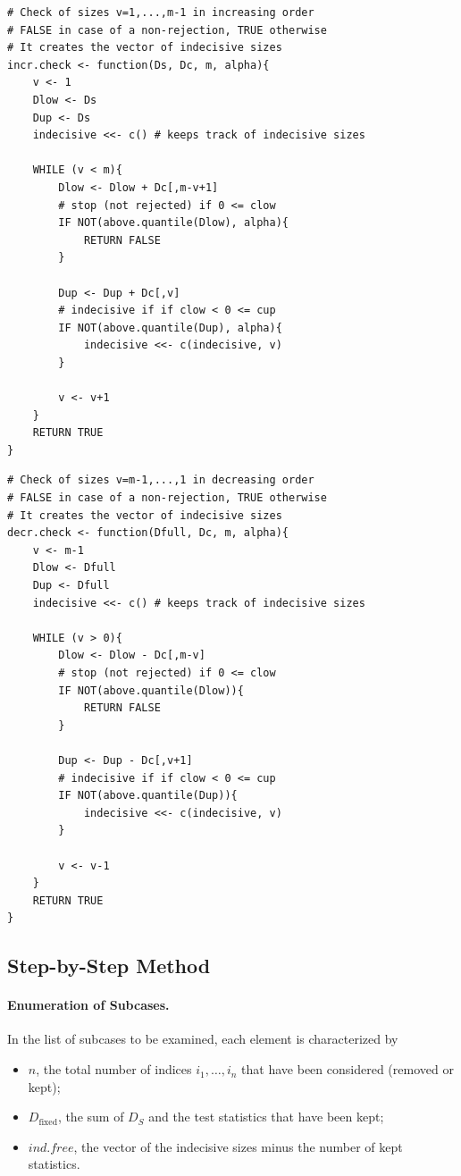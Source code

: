 \documentclass[11pt,a4paper,openright,twoside]{article}
\begin{document}
\begin{lstlisting}
# Check of sizes v=1,...,m-1 in increasing order
# FALSE in case of a non-rejection, TRUE otherwise
# It creates the vector of indecisive sizes
incr.check <- function(Ds, Dc, m, alpha){
	v <- 1
	Dlow <- Ds
	Dup <- Ds
	indecisive <<- c() # keeps track of indecisive sizes

	WHILE (v < m){
		Dlow <- Dlow + Dc[,m-v+1]
		# stop (not rejected) if 0 <= clow
		IF NOT(above.quantile(Dlow), alpha){
			RETURN FALSE
		}

		Dup <- Dup + Dc[,v]
		# indecisive if if clow < 0 <= cup
		IF NOT(above.quantile(Dup), alpha){
			indecisive <<- c(indecisive, v)
		}
	
		v <- v+1
	}
	RETURN TRUE
}
\end{lstlisting}

\begin{lstlisting}
# Check of sizes v=m-1,...,1 in decreasing order
# FALSE in case of a non-rejection, TRUE otherwise
# It creates the vector of indecisive sizes
decr.check <- function(Dfull, Dc, m, alpha){
	v <- m-1
	Dlow <- Dfull
	Dup <- Dfull
	indecisive <<- c() # keeps track of indecisive sizes

	WHILE (v > 0){
		Dlow <- Dlow - Dc[,m-v]
		# stop (not rejected) if 0 <= clow
		IF NOT(above.quantile(Dlow)){
			RETURN FALSE
		}

		Dup <- Dup - Dc[,v+1]
		# indecisive if if clow < 0 <= cup
		IF NOT(above.quantile(Dup)){
			indecisive <<- c(indecisive, v)
		}
	
		v <- v-1
	}
	RETURN TRUE
}
\end{lstlisting}



\vspace{5mm}
\subsection{Step-by-Step Method}

\paragraph{Enumeration of Subcases.} In the list of subcases to be examined, each element is characterized by
\begin{itemize}
\item $n$, the total number of indices $i_1,\ldots,i_n$ that have been considered (removed or kept);
\item $D_{\text{fixed}}$, the sum of $D_S$ and the test statistics that have been kept;
\item $ind.free$, the vector of the indecisive sizes minus the number of kept statistics.
\end{itemize}
\end{document}
